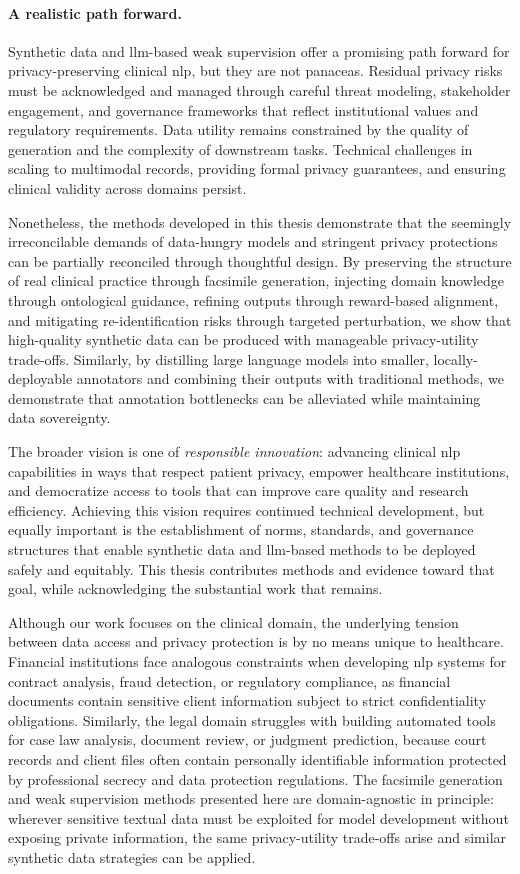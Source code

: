 \paragraph{A realistic path forward.}
Synthetic data and \gls{llm}-based weak supervision offer a promising path forward for privacy-preserving clinical \gls{nlp}, but they are not panaceas.
Residual privacy risks must be acknowledged and managed through careful threat modeling, stakeholder engagement, and governance frameworks that reflect institutional values and regulatory requirements.
Data utility remains constrained by the quality of generation and the complexity of downstream tasks.
Technical challenges in scaling to multimodal records, providing formal privacy guarantees, and ensuring clinical validity across domains persist.

Nonetheless, the methods developed in this thesis demonstrate that the seemingly irreconcilable demands of data-hungry models and stringent privacy protections can be partially reconciled through thoughtful design.
By preserving the structure of real clinical practice through facsimile generation, injecting domain knowledge through ontological guidance, refining outputs through reward-based alignment, and mitigating re-identification risks through targeted perturbation, we show that high-quality synthetic data can be produced with manageable privacy-utility trade-offs.
Similarly, by distilling large language models into smaller, locally-deployable annotators and combining their outputs with traditional methods, we demonstrate that annotation bottlenecks can be alleviated while maintaining data sovereignty.

The broader vision is one of \textit{responsible innovation}: advancing clinical \gls{nlp} capabilities in ways that respect patient privacy, empower healthcare institutions, and democratize access to tools that can improve care quality and research efficiency.
Achieving this vision requires continued technical development, but equally important is the establishment of norms, standards, and governance structures that enable synthetic data and \gls{llm}-based methods to be deployed safely and equitably.
This thesis contributes methods and evidence toward that goal, while acknowledging the substantial work that remains.

Although our work focuses on the clinical domain, the underlying tension between data access and privacy protection is by no means unique to healthcare.
Financial institutions face analogous constraints when developing \gls{nlp} systems for contract analysis, fraud detection, or regulatory compliance, as financial documents contain sensitive client information subject to strict confidentiality obligations.
Similarly, the legal domain struggles with building automated tools for case law analysis, document review, or judgment prediction, because court records and client files often contain personally identifiable information protected by professional secrecy and data protection regulations.
The facsimile generation and weak supervision methods presented here are domain-agnostic in principle: wherever sensitive textual data must be exploited for model development without exposing private information, the same privacy-utility trade-offs arise and similar synthetic data strategies can be applied.